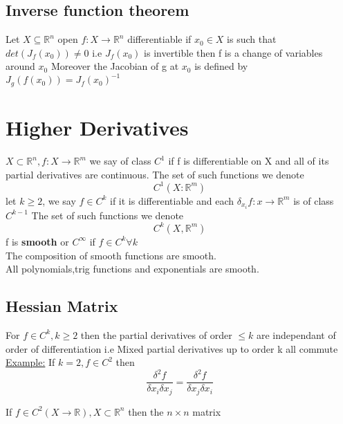 \documentclass[8pt]{extreport}
\newcommand{\R}{\mathbb{R}}
\begin{document}
\subsection{Inverse function theorem}

Let $X \subseteq \R^n$ open $f:X \to \R^n$ differentiable if $x_0 \in X$ is such that $det(J_f(x_0)) \neq 0$ i.e $J_f(x_0)$ is invertible then f is a change of variables around $x_0$ Moreover the Jacobian of g at $x_0$ is defined by $J_g(f(x_0))= J_f(x_0)^{-1}$


\section{Higher Derivatives}

$X \subset \R^n, f: X \to \R^m$ we say of class $C^1$ if f is differentiable on X and all of its partial derivatives are continuous. The set of such functions we denote
$$ C^1(X:\R^m)$$
let $k \geq 2$, we say $f \in C^k$ if it is differentiable and each $\delta_{x_i}f:x \to \R^m$ is of class $C^{k-1}$ The set of such functions we denote
$$C^k(X, \R^m)$$
f is \textbf{smooth} or $C^{\infty}$ if $f \in C^k \forall k$\\
The composition of smooth functions are smooth. \\
All polynomials,trig functions and exponentials are smooth.

\subsection{ Hessian Matrix }
For $f \in C^k, k \geq 2$ then the partial derivatives of order $\leq k $ are independant of order of differentiation i.e Mixed partial derivatives up to order k all commute\\
\underline{Example:}
If $k = 2, f \in C^2$ then
$$ \frac{\delta^2 f}{\delta x_i\delta x_j} = \frac{\delta^2f}{\delta x_j\delta x_i}$$

If $f \in C^2( X \to \R), X \subset \R^n$ then the $n\times n$ matrix 
\end{document}
